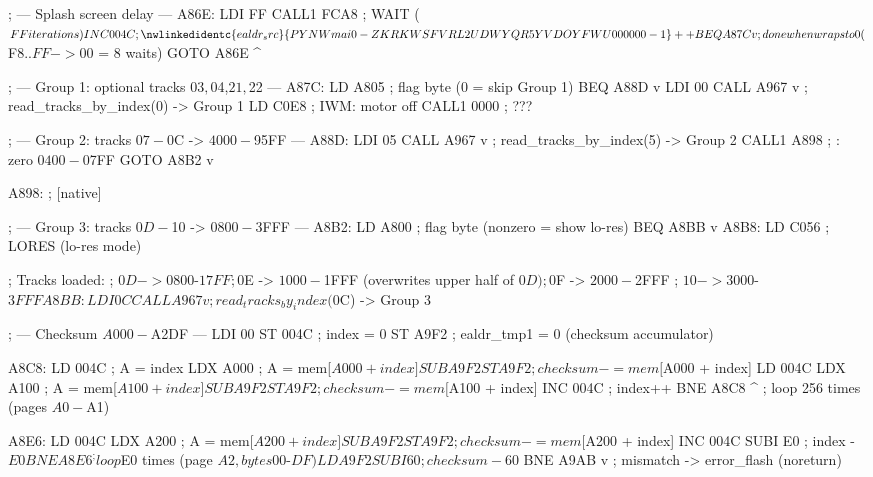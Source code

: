 \documentclass[10pt]{report}
\begin{document}
; --- Splash screen delay ---
A86E:   LDI     FF
        CALL1   FCA8    ; WAIT ($FF iterations)
        INC     004C    ; \nwlinkedidentc{ealdr_src}{PYNWmai0-ZKRKWSFVRL2UDWYQR5YVDOYFWU000000-1}++
        BEQ     A87C v  ; done when wraps to 0 ($F8..$FF->$00 = 8 waits)
        GOTO    A86E ^

; --- Group 1: optional tracks $03,$04,$21,$22 ---
A87C:   LD      A805    ; flag byte (0 = skip Group 1)
        BEQ     A88D v
        LDI     00
        CALL    A967 v  ; read_tracks_by_index(0) -> Group 1
        LD      C0E8    ; IWM: motor off
        CALL1   0000    ; ???

; --- Group 2: tracks $07-$0C -> $4000-$95FF ---
A88D:   LDI     05
        CALL    A967 v  ; read_tracks_by_index(5) -> Group 2
        CALL1   A898    ; : zero $0400-$07FF
        GOTO    A8B2 v

A898:   ; [native] 

; --- Group 3: tracks $0D-$10 -> $0800-$3FFF ---
A8B2:   LD      A800    ; flag byte (nonzero = show lo-res)
        BEQ     A8BB v
A8B8:   LD      C056    ; LORES (lo-res mode)

        ; Tracks loaded:
        ;   $0D -> $0800-$17FF
        ;   $0E -> $1000-$1FFF (overwrites upper half of $0D)
        ;   $0F -> $2000-$2FFF
        ;   $10 -> $3000-$3FFF
A8BB:   LDI     0C
        CALL    A967 v  ; read_tracks_by_index($0C) -> Group 3

; --- Checksum $A000-$A2DF ---
        LDI     00
        ST      004C    ; index = 0
        ST      A9F2    ; ealdr_tmp1 = 0 (checksum accumulator)

A8C8:   LD      004C    ; A = index
        LDX     A000    ; A = mem[$A000 + index]
        SUB     A9F2
        ST      A9F2    ; checksum -= mem[$A000 + index]
        LD      004C
        LDX     A100    ; A = mem[$A100 + index]
        SUB     A9F2
        ST      A9F2    ; checksum -= mem[$A100 + index]
        INC     004C    ; index++
        BNE     A8C8 ^  ; loop 256 times (pages $A0-$A1)

A8E6:   LD      004C
        LDX     A200    ; A = mem[$A200 + index]
        SUB     A9F2
        ST      A9F2    ; checksum -= mem[$A200 + index]
        INC     004C
        SUBI    E0      ; index - $E0
        BNE     A8E6 ^  ; loop $E0 times (page $A2, bytes $00-$DF)

        LD      A9F2
        SUBI    60      ; checksum - $60
        BNE     A9AB v  ; mismatch -> error_flash (noreturn)
\end{document}
